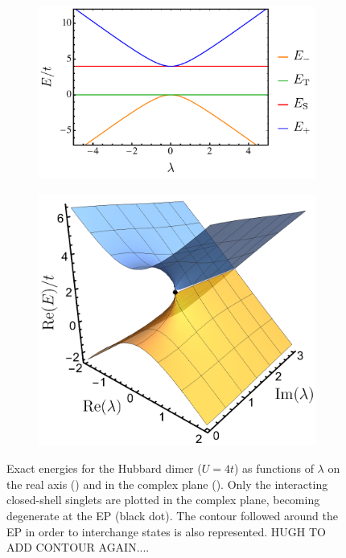 \documentclass[aps,prb,reprint,noshowkeys,superscriptaddress]{revtex4-1}
\newcommand{\hugh}[1]{\textcolor{hughgreen}{#1}}
\begin{document}
\begin{figure}[t]
	\begin{subfigure}{0.49\textwidth}
	\includegraphics[height=0.65\textwidth]{fig1a}
	\subcaption{\label{subfig:FCI_real}}
    \end{subfigure}
	\begin{subfigure}{0.49\textwidth}
	\includegraphics[height=0.65\textwidth]{fig1b}
	\subcaption{\label{subfig:FCI_cplx}}
    \end{subfigure}
	\caption{%
	Exact energies for the Hubbard dimer ($U=4t$) as functions of $\lambda$ on the real axis () and in the complex plane ().
    Only the interacting closed-shell singlets are plotted in the complex plane, becoming degenerate at the EP (black dot).
    The contour followed around the EP in order to interchange states is also represented.
    \hugh{HUGH TO ADD CONTOUR AGAIN....}
	\label{fig:FCI}}
\end{figure}
\end{document}
